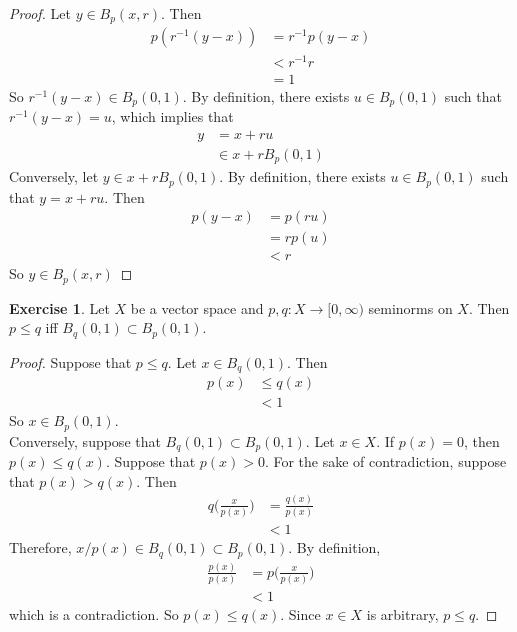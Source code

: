 \documentclass[12pt]{amsart}
\theoremstyle{definition}
\newtheorem{ex}[definition]{Exercise}
\DeclareMathOperator*{\0}{\mbf{0}}
\DeclareMathOperator*{\1}{\mbf{1}}
\begin{document}
	\begin{proof}
		Let $y \in B_p(x, r)$. Then  
		\begin{align*}
			p(r^{-1}(y - x)) 
			&= r^{-1}p(y - x) \\
			&< r^{-1} r \\
			&= 1
		\end{align*}
		So $r^{-1}(y - x) \in B_p(0, 1)$. By definition, there exists $u \in B_p(0,1)$ such that $r^{-1}(y - x) = u$, which implies that 
		\begin{align*}
			y 
			&=  x + ru \\
			&\in x + rB_p(0, 1)
		\end{align*} 
		Conversely, let $y \in x + rB_p(0, 1)$. By definition, there exists $u \in B_p(0,1)$ such that $y = x + ru$. Then 
		\begin{align*}
			p(y - x) 
			&= p(ru) \\
			&= rp(u) \\
			&< r
		\end{align*}
	So $y \in B_p(x, r)$ 
	\end{proof}

	\begin{ex}
		Let $X$ be a vector space and $p,q:X \rightarrow [0, \infty)$ seminorms on $X$. Then $p \leq q$ iff $B_q(0,1) \subset B_p(0,1)$.  
	\end{ex}

	\begin{proof}
		Suppose that $p \leq q$. Let $x \in B_q(0,1)$. Then 
		\begin{align*}
			p(x) 
			& \leq q(x) \\
			& < 1
		\end{align*}
		So $x \in B_p(0,1)$. \\
		Conversely, suppose that $B_q(0,1) \subset B_p(0,1)$. Let $x \in X$. If $p(x) = 0$, then $p(x) \leq q(x)$. Suppose that $p(x) > 0$. For the sake of contradiction, suppose that $p(x) > q(x)$. Then 
		\begin{align*}
			q \bigg( \frac{x}{p(x)}\bigg) 
			&= \frac{q(x)}{p(x)} \\
			& < 1
		\end{align*}
		Therefore, $x/p(x) \in B_q(0,1) \subset B_p(0,1)$. By definition,
		\begin{align*}
			\frac{p(x)}{p(x)}
			& =  p\bigg( \frac{x}{p(x)}\bigg)\\
			&< 1
		\end{align*} 
		which is a contradiction. So $p(x) \leq q(x)$. Since $x \in X$ is arbitrary, $p \leq q$.
	\end{proof}
\end{document}

